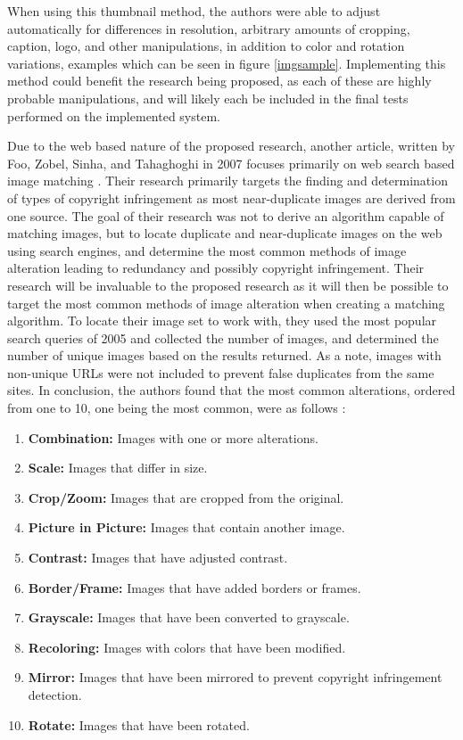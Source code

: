 \documentclass[11pt]{article}
\begin{document}
When using this thumbnail method, the authors were able to adjust automatically for differences in resolution, arbitrary amounts of cropping, caption, logo, and other manipulations, in addition to color and rotation variations, examples which can be seen in figure \ref{imgsample}. Implementing this method could benefit the research being proposed, as each of these are highly probable manipulations, and will likely each be included in the final tests performed on the implemented system.

Due to the web based nature of the proposed research, another article, written by Foo, Zobel, Sinha, and Tahaghoghi in 2007 focuses primarily on web search based image matching \cite{Foo:2007}. Their research primarily targets the finding and determination of types of copyright infringement as most near-duplicate images are derived from one source. The goal of their research was not to derive an algorithm capable of matching images, but to locate duplicate and near-duplicate images on the web using search engines, and determine the most common methods of image alteration leading to redundancy and possibly copyright infringement. Their research will be invaluable to the proposed research as it will then be possible to target the most common methods of image alteration when creating a matching algorithm. To locate their image set to work with, they used the most popular search queries of 2005 and collected the number of images, and determined the number of unique images based on the results returned. As a note, images with non-unique URLs were not included to prevent false duplicates from the same sites. In conclusion, the authors found that the most common alterations, ordered from one to 10, one being the most common, were as follows \cite{Foo:2007}:
\begin{enumerate}
\item
\textbf{Combination:} Images with one or more alterations.
\item
\textbf{Scale:} Images that differ in size.
\item
\textbf{Crop/Zoom:} Images that are cropped from the original.
\item
\textbf{Picture in Picture:} Images that contain another image.
\item
\textbf{Contrast:} Images that have adjusted contrast.
\item
\textbf{Border/Frame:} Images that have added borders or frames.
\item
\textbf{Grayscale:} Images that have been converted to grayscale.
\item
\textbf{Recoloring:} Images with colors that have been modified.
\item
\textbf{Mirror:} Images that have been mirrored to prevent copyright infringement detection.
\item
\textbf{Rotate:} Images that have been rotated.
\end{enumerate}
\end{document}
